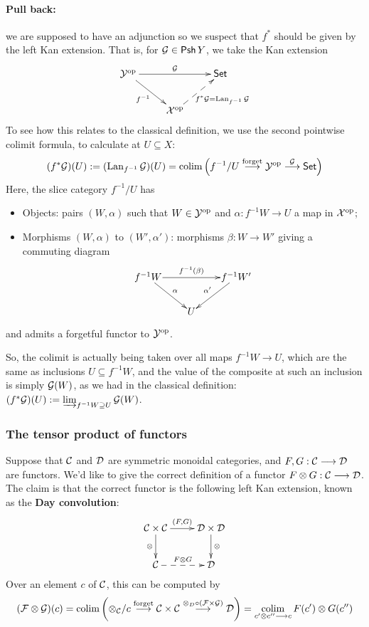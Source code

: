 \documentclass[11pt]{article}
\begin{document}
\begin{1. Kan Extensions}
\begin{shaded}
\paragraph*{Pull back:} we are supposed to have an adjunction 
so we suspect that $f^*$ should be given by the left Kan extension. That is, for $\mathcal{G}\in\operatorname{{\mathsf{Psh}}} Y$, we take the Kan extension
\[\vcenter{\xymatrix{
\calY^\op\ar[rd]_-{f^{-1}} \ar[rr]^-{\calG}_-{}="arF"&%
&%
\Set\\%
&%
\calX^\op\ar@{-->}[ur]_{f^*\calG=\Lan_{f^{-1}}\calG} %
}}
\]
To see how this relates to the classical definition, we use the second pointwise colimit formula, to calculate at $U\subseteq X$:
\[(f^*\mathcal{G})(U):=(\operatorname{Lan}_{f^{-1}}\mathcal{G})(U)=\operatorname*{colim}\left(f^{-1}/U\overset{\textup{forget}}{\longrightarrow}\mathcal{Y}^{\textup{op}}\overset{\mathcal{G}}{\longrightarrow}\operatorname{{\mathsf{Set}}}\right)\]
Here, the slice category $f^{-1}/U$ has 
\begin{itemize}\squishlist
\item Objects: pairs $(W,\alpha)$ such that $W\in\mathcal{Y}^{\textup{op}}$ and $\alpha:f^{-1}W\to U$ a map in $\mathcal{X}^{\textup{op}}$;
\item Morphisms $(W,\alpha)$ to $(W',\alpha')$: morphisms $\beta:W\to W'$ giving a commuting diagram \[
\vcenter{\xymatrix@1{
f^{-1}W\ar[rd]^-{\alpha}
\ar[rr]^-{f^{-1}(\beta)}
&&%
f^{-1}W'\ar[ld]_-{\alpha'}\\%
&U&%
}}\]
\end{itemize}
and admits a forgetful functor to $\mathcal{Y}^{\textup{op}}$.

So, the colimit is actually being taken over all maps $f^{-1}W\to U$, which are the same as inclusions $U\subseteq f^{-1}W$, and the value of the composite at such an inclusion is simply $\mathcal{G}(W)$, as we had in the classical definition: $(f^*\mathcal{G})(U):=\varinjlim_{f^{-1}W\supseteq U}\mathcal{G}(W)$.
\subsubsection*{The tensor product of functors}
Suppose that $\mathcal{C}$ and $\mathcal{D}$ are symmetric monoidal categories, and $F,G:\mathcal{C}\longrightarrow\mathcal{D}$ are functors. We'd like to give the correct definition of a functor $F\otimes G:\mathcal{C}\longrightarrow\mathcal{D}$. The claim is that the correct functor is the following left Kan extension, known as the \textbf{Day convolution}:
\[\xymatrix{
\calC\times\calC\ar[r]^-{(F,G)}\ar[d]_-{\otimes}&%
\calD\times\calD\ar[d]^-{\otimes}\\%
\calC\ar@{-->}[r]^-{F\otimes G}&%
\calD%
}\]
Over an element $c$ of $\mathcal{C}$, this can be computed by
\[(\mathcal{F}\otimes\mathcal{G})(c)= \operatorname*{colim}\left(\otimes_{\mathcal{C}}/c\overset{\textup{forget}}{\longrightarrow}\mathcal{C}\times\mathcal{C} \overset{\otimes_D\circ(\mathcal{F}\times\mathcal{G})}{\longrightarrow}\mathcal{D}\right)=\operatorname*{colim}_{c'\otimes c''\longrightarrow c}F(c')\otimes G(c'')\]

\end{shaded}
\end{1. Kan Extensions}
\end{document}
